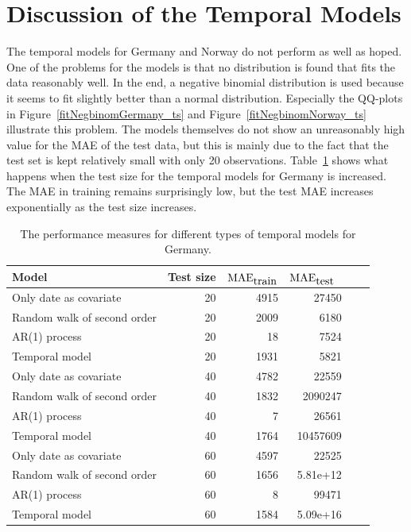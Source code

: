 \section{Discussion of the Temporal Models}
The temporal models for Germany and Norway do not perform as well as hoped. One of the problems for the models is that no distribution is found that fits the data reasonably well. In the end, a negative binomial distribution is used because it seems to fit slightly better than a normal distribution. Especially the QQ-plots in Figure~\ref{fitNegbinomGermany_ts} and Figure~\ref{fitNegbinomNorway_ts} illustrate this problem. The models themselves do not show an unreasonably high value for the MAE of the test data, but this is mainly due to the fact that the test set is kept relatively small with only 20 observations. Table~\ref{germany_temporal_2} shows what happens when the test size for the temporal models for Germany is increased. The MAE in training remains surprisingly low, but the test MAE increases exponentially as the test size increases. 
\begin{table}[H] 
\caption{The performance measures for different types of temporal models for Germany. \label{germany_temporal_2}}
\begin{tabular}{l r r r r r}
\toprule
\textbf{Model}	& Test size & \textbf{$\hbox{MAE}_{\hbox{train}}$} & \textbf{$\hbox{MAE}_{\hbox{test}}$}\ \\
\midrule
Only date as covariate & 20 & 4915 & 27450 \\
Random walk of second order & 20 & 2009 & 6180 \\
AR(1) process & 20 & 18 & 7524 \\
Temporal model &  20 & 1931 & 5821 \\
Only date as covariate & 40 & 4782 & 22559 \\
Random walk of second order & 40 & 1832 & 2090247 \\
AR(1) process & 40 & 7 & 26561 \\
Temporal model &  40 & 1764 & 10457609 \\
Only date as covariate & 60 & 4597 & 22525 \\
Random walk of second order & 60 & 1656 & 5.81e+12 \\
AR(1) process & 60 & 8 & 99471 \\
Temporal model &  60 & 1584 & 5.09e+16 \\
\bottomrule
\end{tabular}
\end{table}

